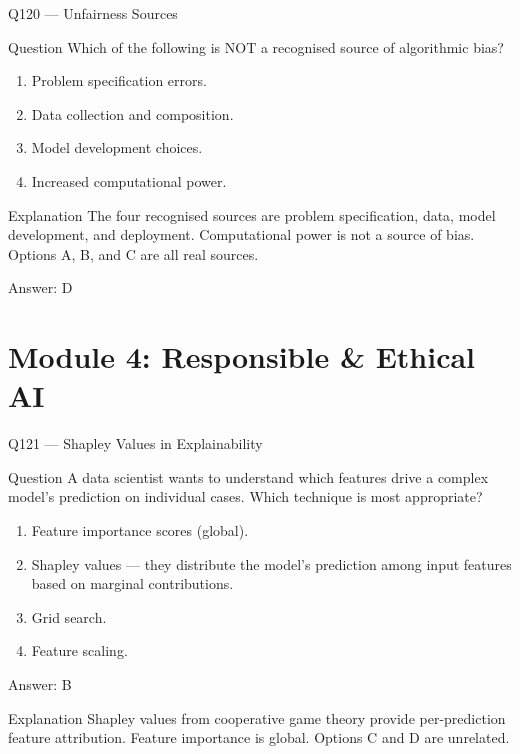 \documentclass[aspectratio=169,8pt]{beamer}
\begin{document}
\begin{frame}{Q120 --- Unfairness Sources}
	
	\begin{block}{Question}
		Which of the following is NOT a recognised source of algorithmic bias?
		
		\begin{enumerate}
			\item Problem specification errors.
			\item Data collection and composition.
			\item Model development choices.
			\item Increased computational power.
		\end{enumerate}
	\end{block}
	
	\begin{block}{Explanation}
		The four recognised sources are problem specification, data, model development, and deployment. Computational power is not a source of bias. Options A, B, and C are all real sources.
	\end{block}
	
	\begin{exampleblock}{Answer: D}
	\end{exampleblock}
	
\end{frame}



\section{Module 4: Responsible \& Ethical AI}

\begin{frame}{Q121 --- Shapley Values in Explainability}
\begin{block}{Question}
A data scientist wants to understand which features drive a complex model's prediction on individual cases. Which technique is most appropriate?
\end{block}
\begin{enumerate}
\item Feature importance scores (global).
\item Shapley values --- they distribute the model's prediction among input features based on marginal contributions.
\item Grid search.
\item Feature scaling.
\end{enumerate}
\begin{exampleblock}{Answer: B}\end{exampleblock}
\begin{block}{Explanation}
Shapley values from cooperative game theory provide per-prediction feature attribution. Feature importance is global. Options C and D are unrelated.
\end{block}
\end{frame}
\end{document}
